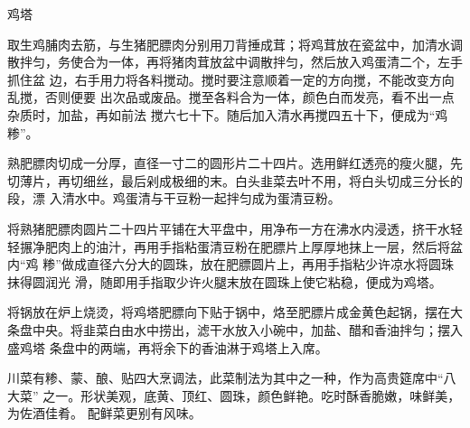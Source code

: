 \begin{recipe}[金钱鸡塔]{鸡塔}

\ingredients


\preparation

\step 取生鸡脯肉去筋，与生猪肥膘肉分别用刀背捶成茸；将鸡茸放在瓷盆中，加清水调
散拌匀，务使合为一体，再将猪肉茸放盆中调散拌匀，然后放入鸡蛋清二个，左手抓住盆
边，右手用力将各料搅动。搅时要注意顺着一定的方向搅，不能改变方向乱搅，否则便要
出次品或废品。搅至各料合为一体，颜色白而发亮，看不出一点杂质时，加盐，再如前法
搅六七十下。随后加入清水再搅四五十下，便成为“鸡糁”。

\step 熟肥膘肉切成一分厚，直径一寸二的圆形片二十四片。选用鲜红透亮的瘦火腿，先
切薄片，再切细丝，最后剁成极细的末。白头韭菜去叶不用，将白头切成三分长的段，漂
入清水中。鸡蛋清与干豆粉一起拌匀成为蛋清豆粉。

\step 将熟猪肥膘肉圆片二十四片平铺在大平盘中，用净布一方在沸水内浸透，挤干水轻
轻搌净肥肉上的油汁，再用手指粘蛋清豆粉在肥膘片上厚厚地抹上一层，然后将盆内“鸡
糁”做成直径六分大的圆珠，放在肥膘圆片上，再用手指粘少许凉水将圆珠抹得圆润光
滑，随即用手指取少许火腿末放在圆珠上使它粘稳，便成为鸡塔。

\step 将锅放在炉上烧烫，将鸡塔肥膘向下贴于锅中，烙至肥膘片成金黄色起锅，摆在大
条盘中央。将韭菜白由水中捞出，滤干水放入小碗中，加盐、醋和香油拌匀；摆入盛鸡塔
条盘中的两端，再将余下的香油淋于鸡塔上入席。

\features

川菜有糁、蒙、酿、贴四大烹调法，此菜制法为其中之一种，作为高贵筵席中“八大菜”
之一。形状美观，底黄、顶红、圆珠，颜色鲜艳。吃时酥香脆嫩，味鲜美，为佐酒佳肴。
配鲜菜更别有风味。

\end{recipe}


